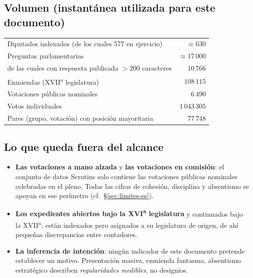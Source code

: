 \subsection{Volumen (instantánea utilizada para este documento)}
\begin{center}\small
\begin{tabular}{@{}lr@{}}
\toprule
Diputados indexados (de los cuales 577 en ejercicio) & $\approx 630$ \\
Preguntas parlamentarias & $\approx 17\,000$ \\
\quad de las cuales con respuesta publicada $>200$ caracteres & $10\,766$ \\
Enmiendas (XVII\textsuperscript{a} legislatura) & $108\,115$ \\
Votaciones públicas nominales & $6\,490$ \\
Votos individuales & $1\,043\,305$ \\
Pares (grupo, votación) con posición mayoritaria & $77\,748$ \\
\bottomrule
\end{tabular}
\end{center}

\subsection{Lo que queda fuera del alcance}
\begin{itemize}
  \item \textbf{Las votaciones a mano alzada} y \textbf{las votaciones en
        comisión}: el conjunto de datos \og{}Scrutins\fg{} solo contiene las
        votaciones públicas nominales celebradas en el pleno. Todas las cifras de
        cohesión, disciplina y absentismo se apoyan en ese perímetro
        (cf.~§\ref{sec:limites-es}).
  \item \textbf{Los expedientes abiertos bajo la XVI\textsuperscript{a}
        legislatura} y continuados bajo la XVII\textsuperscript{a}: están indexados
        pero asignados a su legislatura de origen, de ahí pequeñas discrepancias
        entre contadores.
  \item \textbf{La inferencia de intención}: ningún indicador de este documento
        pretende establecer un motivo. \og{}Presentación masiva\fg{}, \og{}enmienda
        fantasma\fg{}, \og{}absentismo estratégico\fg{} describen \emph{regularidades
        medibles}, no designios.
\end{itemize}

